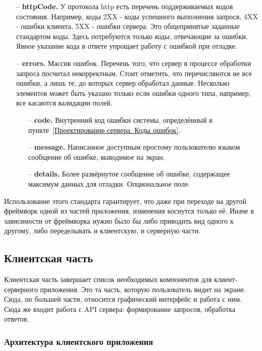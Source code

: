 \documentclass[a4paper,article]{article}
\begin{document}
    \begin{itemize}[nolistsep]
        \item[--] \textbf{httpCode.} У протокола http есть перечень поддерживаемых кодов состояния. Например, коды 2XX - коды успешного выполнения запрося, 4XX - ошибки клиента, 5XX - ошибки сервера. Это общепринятые заданные стандартом коды. Здесь потребуются только коды, отвечающие за ошибки. Явное указание кода в ответе упрощает работу с ошибкой при отладке.
        \item[--] \textbf{errors.} Массив ошибок. Перечень того, что сервер в процессе обработки запроса посчитал некорректным. Стоит отметить, что перечисляются не все ошибки, а лишь те, до которых сервер обработал данные. Несколько элементов может быть указано только если ошибки одного типа, например, все касаются валидации полей.
        \begin{itemize}[nolistsep]
            \item[--] \textbf{code.} Внутренний код ошибки системы, определённый в пункте~\ref{Проектирование сервера. Коды ошибок}.
            \item[--] \textbf{message.} Написанное доступным простому пользователю языком сообщение об ошибке, выводимое на экран.
            \item[--] \textbf{details.} Более развёрнутое сообщение об ошибке, содержащее максимум данных для отладки. Опциональное поле.
        \end{itemize}
    \end{itemize}

    Использование этого стандарта гарантирует, что даже при переходе на другой фреймворк одной из частей приложения, изменения коснутся только её. Иначе в зависимости от фреймворка нужно было бы либо приводить вид одного к другому, либо переделывать и клиентскую, и серверную части.

    \newpage

    \subsection{Клиентская часть}

    Клиентская часть завершает список необходимых компонентов для клиент-серверного приложения. Это та часть, которую пользователь видит на экране. Сюда, по большей части, относится графический интерфейс и работа с ним. Сюда же входит работа с API сервера: формирование запросов, обработка ответов.

    \subsubsection{Архитектура клиентского приложения}
\end{document}
